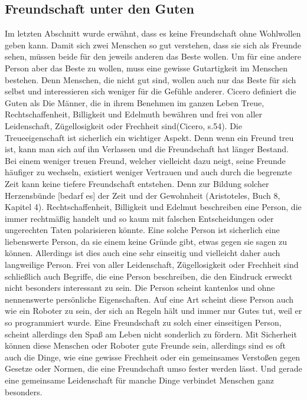 \documentclass[12pt]{article}
\begin{document}
\subsection{Freundschaft unter den Guten}
Im letzten Abschnitt wurde erwähnt, dass es keine Freundschaft ohne Wohlwollen geben kann. Damit sich zwei Menschen so gut verstehen, dass sie sich als Freunde sehen, müssen beide für den jeweils anderen das Beste wollen. Um für eine andere Person aber das Beste zu wollen, muss eine gewisse Gutartigkeit im Menschen bestehen. Denn Menschen, die nicht gut sind, wollen auch nur das Beste für sich selbst und interessieren sich weniger für die Gefühle anderer. Cicero definiert die Guten als \glqq Die Männer, die in ihrem Benehmen im ganzen Leben Treue, Rechtschaffenheit, Billigkeit und Edelmuth bewähren und frei von aller Leidenschaft, Zügellosigkeit oder Frechheit sind\grqq(Cicero, s.54). Die Treueeigenschaft ist sicherlich ein wichtiger Aspekt. Denn wenn ein Freund treu ist, kann man sich auf ihn Verlassen und die Freundschaft hat länger Bestand. Bei einem weniger treuen Freund, welcher vielleicht dazu neigt, seine Freunde häufiger zu wechseln, existiert weniger Vertrauen und auch durch die begrenzte Zeit kann keine tiefere Freundschaft entstehen. Denn \glqq zur Bildung solcher Herzensbünde [bedarf es] der Zeit und der Gewohnheit \grqq(Aristoteles, Buch 8, Kapitel 4).\newline
Rechtschaffenheit, Billigkeit und Edelmut beschreiben eine Person, die immer rechtmäßig handelt und so kaum mit falschen Entscheidungen oder ungerechten Taten polarisieren könnte. Eine solche Person ist sicherlich eine liebenswerte Person, da sie einem keine Gründe gibt, etwas gegen sie sagen zu können. Allerdings ist dies auch eine sehr einseitig und vielleicht daher auch langweilige Person. Frei von aller Leidenschaft, Zügellosigkeit oder Frechheit sind schließlich auch Begriffe, die eine Person beschreiben, die den Eindruck erweckt nicht besonders interessant zu sein. Die Person scheint kantenlos und ohne nennenswerte persönliche Eigenschaften. Auf eine Art scheint diese Person auch wie ein Roboter zu sein, der sich an Regeln hält und immer nur Gutes tut, weil er so programmiert wurde. Eine Freundschaft zu solch einer einseitigen Person, scheint allerdings den Spaß am Leben nicht sonderlich zu fördern. Mit Sicherheit können diese Menschen oder Roboter gute Freunde sein, allerdings sind es oft auch die Dinge, wie eine gewisse Frechheit oder ein gemeinsames Verstoßen gegen Gesetze oder Normen, die eine Freundschaft umso fester werden lässt. Und gerade eine gemeinsame Leidenschaft für manche Dinge verbindet Menschen ganz besonders.\newline
\end{document}
